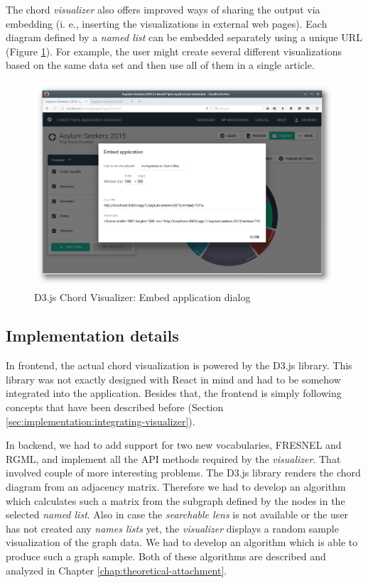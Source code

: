 The chord \emph{visualizer} also offers improved ways of sharing the output via embedding (i. e., inserting the visualizations in external web pages). Each diagram defined by a \emph{named list} can be embedded separately using a unique URL (Figure \ref{fig:chord-embed-configuration}). For example, the user might create several different visualizations based on the same data set and then use all of them in a single article.

\begin{figure}
	\centering
	\includegraphics[width=145mm]{img/06_chord_embed_configuration}
	\caption{D3.js Chord Visualizer: Embed application dialog}
    \label{fig:chord-embed-configuration}
\end{figure}

\subsection{Implementation details}

In frontend, the actual chord visualization is powered by the D3.js library. This library was not exactly designed with React in mind and had to be somehow integrated into the application. Besides that, the frontend is simply following concepts that have been described before (Section \ref{sec:implementation:integrating-visualizer}).

In backend, we had to add support for two new vocabularies, FRESNEL and RGML, and implement all the API methods required by the \emph{visualizer}. That involved couple of more interesting problems. The D3.js library renders the chord diagram from an adjacency matrix. Therefore we had to develop an algorithm which calculates such a matrix from the subgraph defined by the nodes in the selected \emph{named list}. Also in case the \emph{searchable lens} is not available or the user has not created any \emph{names lists} yet, the \emph{visualizer} displays a random sample visualization of the graph data. We had to develop an algorithm which is able to produce such a graph sample. Both of these algorithms are described and analyzed in Chapter \ref{chap:theoretical-attachment}.

